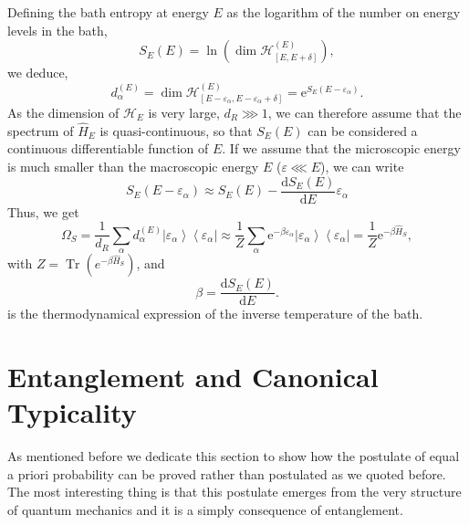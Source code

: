 \indent Defining the bath entropy at energy $E$ as the logarithm of the number on energy levels in the bath,
\begin{equation}
S_{E}(E)=\ln \left(\operatorname{dim} \mathcal{H}_{[E, E+\delta]}^{(E)}\right),
\label{CH1:equiprobable_canonical_5}
\end{equation}
we deduce,
\begin{equation}
d_{\alpha}^{(E)}=\operatorname{dim} \mathcal{H}_{\left[E-\varepsilon_{\alpha}, E-\varepsilon_{\alpha}+\delta\right]}^{(E)}=\mathrm{e}^{S_{E}\left(E-\varepsilon_{\alpha}\right)}.
\label{CH1:equiprobable_canonical_6}
\end{equation}
\indent As the dimension of $\mathcal{H}_{E}$ is very large, $d_R\ggg 1$, we can therefore assume that the spectrum of $\hat{H}_E$ is quasi-continuous, so that $S_E (E)$ can be considered a continuous differentiable function of $E$. If we assume that the microscopic energy is much smaller than the macroscopic energy $E$ ($\varepsilon\lll E$), we can write
\begin{equation}
S_{E}\left(E-\varepsilon_{\alpha}\right) \approx S_{E}(E)-\frac{\mathrm{d} S_{E}(E)}{\mathrm{d} E} \varepsilon_{\alpha}
\label{CH1:equiprobable_canonical_7}
\end{equation}
\indent Thus, we get
\begin{equation}
\Omega_{S}=
\frac{1}{d_{R}} \sum_{\alpha} d_{\alpha}^{(E)}\left|\varepsilon_{\alpha}\right\rangle\left\langle\varepsilon_{\alpha}\right|
\approx \frac{1}{Z} \sum_{\alpha} \mathrm{e}^{-\beta \varepsilon_{\alpha}}\left| \varepsilon_{\alpha}\right\rangle\left\langle\varepsilon_{\alpha}\right|
=\frac{1}{Z} \mathrm{e}^{-\beta \hat{H}_{S}},
\label{CH1:equiprobable_canonical_8}
\end{equation}
with $Z=\operatorname{Tr}\left(e^{-\beta\hat{H}_S}\right)$, and 
\begin{equation}
\beta=\frac{\mathrm{d} S_{E}(E)}{\mathrm{d} E}.
\end{equation}
is the thermodynamical expression of the inverse temperature of the bath.
\section{Entanglement and Canonical Typicality}

As mentioned before we dedicate this section to show how the postulate of equal a priori probability can be proved rather than postulated as we quoted before. The most interesting thing is that this postulate emerges from the very structure of quantum mechanics and it is a simply consequence of entanglement.
